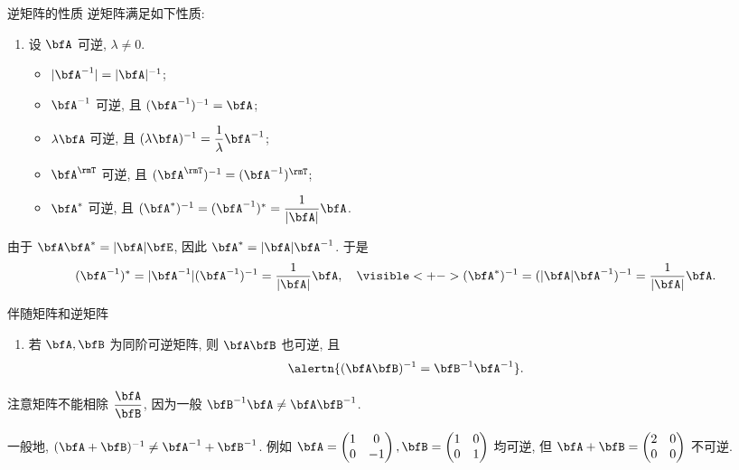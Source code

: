 \begin{frame}{逆矩阵的性质}
	\onslide<+->
	逆矩阵满足如下性质:
	\begin{enumerate}\bf
		\item 设 $\bfA$ 可逆, $\lambda\neq 0$.
			\begin{itemize}
				\item $|\bfA^{-1}|=|\bfA|^{-1}$;
				\item $\bfA^{-1}$ 可逆, 且 $(\bfA^{-1})^{-1}=\bfA$;
				\item $\lambda\bfA$ 可逆, 且 $(\lambda\bfA)^{-1}=\dfrac1\lambda\bfA^{-1}$;
				\item $\bfA^\rmT$ 可逆, 且 $(\bfA^\rmT)^{-1}=(\bfA^{-1})^\rmT$;
				\item $\bfA^*$ 可逆, 且 $(\bfA^*)^{-1}=(\bfA^{-1})^*=\dfrac1{|\bfA|}\bfA$.
			\end{itemize}
	\end{enumerate}
	\onslide<+->
	由于 $\bfA\bfA^*=|\bfA|\bfE$, 因此 $\bfA^*=|\bfA|\bfA^{-1}$.
	\onslide<+->
	于是
	\[(\bfA^{-1})^*=|\bfA^{-1}|(\bfA^{-1})^{-1}=\frac1{|\bfA|}\bfA,\quad\visible<+->{(\bfA^*)^{-1}=(|\bfA|\bfA^{-1})^{-1}=\frac1{|\bfA|}\bfA.}\]
\end{frame}



\begin{frame}{伴随矩阵和逆矩阵}
	\begin{enumerate}\bf
		\setcounter{enumi}{1}
		\item 若 $\bfA,\bfB$ 为同阶可逆矩阵, 则 $\bfA\bfB$ 也可逆, 且
		\[\alertn{(\bfA\bfB)^{-1}=\bfB^{-1}\bfA^{-1}}.\]
		\onslide<+->{%
			一般地 
			\[\alertn{(\bfA_1\bfA_2\cdots\bfA_n)^{-1}=\bfA_n^{-1}\cdots\bfA_2^{-1}\bfA_1^{-1}}.\]
		}
	\end{enumerate}

	\onslide<+->
	注意矩阵不能相除 $\dfrac{\bfA}{\bfB}$, 因为一般 $\bfB^{-1}\bfA\neq\bfA\bfB^{-1}$.

	\onslide<+->
	一般地, $(\bfA+\bfB)^{-1}\neq\bfA^{-1}+\bfB^{-1}$.
	\onslide<+->
	例如 $\bfA=\begin{pmatrix}
		1&0\\0&-1
	\end{pmatrix},\bfB=\begin{pmatrix}
		1&0\\0&1
	\end{pmatrix}$ 均可逆, 但 $\bfA+\bfB=\begin{pmatrix}
		2&0\\0&0
	\end{pmatrix}$ 不可逆.
\end{frame}



